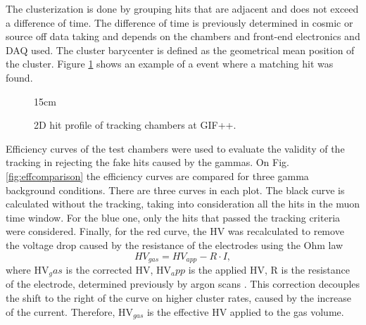 The clusterization is done by grouping hits that are adjacent and does not exceed a difference of time. The difference of time is previously determined in cosmic or source off data taking and depends on the chambers and front-end electronics and DAQ used. The cluster barycenter is defined as the geometrical mean position of the cluster. Figure \ref{fig:tracking_evt} shows an example of a event where a matching hit was found.

\begin{figure}[!htm]{15cm}
\caption{2D hit profile of tracking chambers at GIF++.}%
\label{fig:tracking_evt}
\end{figure}

Efficiency curves of the test chambers were used to evaluate the validity of the tracking in rejecting the fake hits caused by the gammas. On Fig. \ref{fig:effcomparison} the efficiency curves are compared for three gamma background conditions. There are three curves in each plot. The black curve is calculated without the tracking, taking into consideration all the hits in the muon time window. For the blue one, only the hits that passed the tracking criteria were considered. Finally, for the red curve, the HV was recalculated to remove the voltage drop caused by the resistance of the electrodes using the Ohm law
\begin{equation}
    HV_{gas} = HV_{app} - R \cdot I,
\end{equation}
where HV$_gas$ is the corrected HV, HV$_app$ is the applied HV, R is the resistance of the electrode, determined previously by argon scans \cite{peskov2018resistive}. This correction decouples the shift to the right of the curve on higher cluster rates, caused by the increase of the current. Therefore, HV$_{gas}$ is the effective HV applied to the gas volume. 

